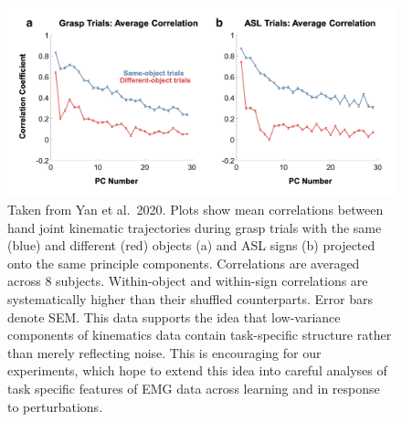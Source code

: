 \documentclass[
  a4paper,
]{article}
\begin{document}
\begin{figure}
\hypertarget{fig:low_variance_PCs}{%
\centering
\includegraphics[width=1\textwidth,height=\textheight]{images/physiology/background/low_variance_PCs.png}
\caption{Taken from Yan et al.~2020. Plots show mean correlations
between hand joint kinematic trajectories during grasp trials with the
same (blue) and different (red) objects (a) and ASL signs (b) projected
onto the same principle components. Correlations are averaged across 8
subjects. Within-object and within-sign correlations are systematically
higher than their shuffled counterparts. Error bars denote SEM. This
data supports the idea that low-variance components of kinematics data
contain task-specific structure rather than merely reflecting noise.
This is encouraging for our experiments, which hope to extend this idea
into careful analyses of task specific features of EMG data across
learning and in response to perturbations.}\label{fig:low_variance_PCs}
}
\end{figure}
\end{document}
